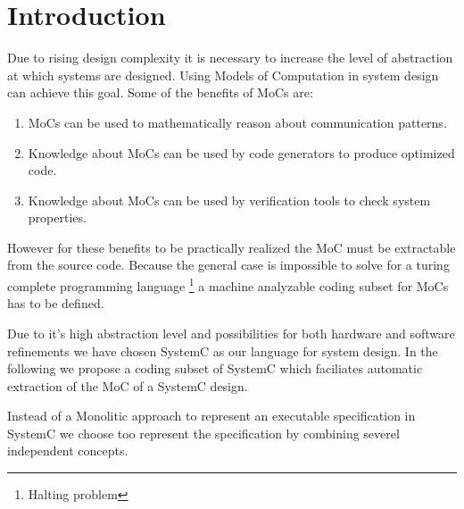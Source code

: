\newcommand{\resdir}{../hscd-tex-res/}




\clearpage
\tableofcontents
\clearpage

\section{Introduction\label{intro}}
Due to rising design complexity it is necessary to increase
the level of abstraction at which systems are designed. Using
Models of Computation in system design can achieve this goal.
Some of the benefits of MoCs are:
\begin{enumerate}
\item MoCs can be used to mathematically reason about communication
patterns.

\item Knowledge about MoCs can be used by code generators to produce
optimized code.

\item Knowledge about MoCs can be used by verification tools to
check system properties.
\end{enumerate}
However for these benefits to be practically realized the
MoC must be extractable from the source code. Because the general case
is impossible to solve for a turing complete programming language
\footnote{Halting problem} a machine analyzable coding subset for
MoCs has to be defined.

Due to it's high abstraction level and possibilities for both
hardware and software refinements we have chosen SystemC as
our language for system design. In the following we propose a
coding subset of SystemC which faciliates automatic extraction
of the MoC of a SystemC design.

Instead of a Monolitic approach to represent an executable specification
in SystemC we choose too represent the specification
by combining severel independent concepts.

